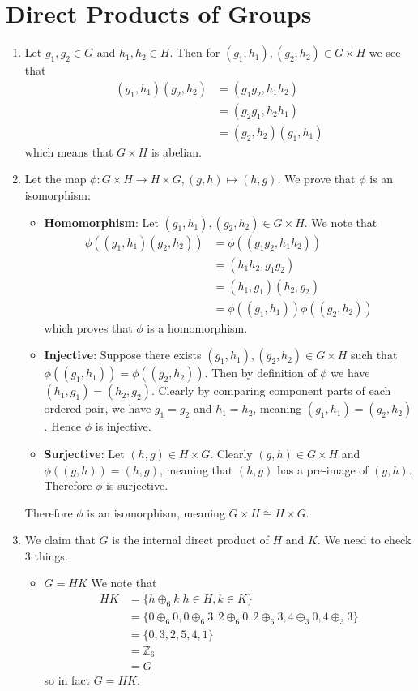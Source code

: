 \section{Direct Products of Groups}
\begin{enumerate}
    \item Let $g_1, g_2 \in G$ and $h_1, h_2 \in H$. Then for $(g_1, h_1), (g_2, h_2) \in G\times H$ we see that
    \begin{align*}
        (g_1, h_1)(g_2, h_2) &= (g_1g_2, h_1h_2)\\
        &= (g_2g_1, h_2h_1)\\
        &= (g_2,h_2)(g_1,h_1)
    \end{align*}
    which means that $G \times H$ is abelian.

    \item Let the map $\phi: G\times H \to H \times G, (g, h) \mapsto (h, g)$. We prove that $\phi$ is an isomorphism:
    \begin{itemize}
        \item \textbf{Homomorphism}: Let $(g_1, h_1), (g_2, h_2) \in G \times H$. We note that
        \begin{align*}
            \phi((g_1, h_1)(g_2, h_2)) &= \phi((g_1g_2, h_1h_2))\\
            &= (h_1h_2, g_1g_2)\\
            &= (h_1, g_1)(h_2, g_2)\\
            &= \phi((g_1, h_1))\phi((g_2, h_2))
        \end{align*}
        which proves that $\phi$ is a homomorphism.
        \item \textbf{Injective}: Suppose there exists $(g_1, h_1), (g_2, h_2) \in G \times H$ such that $\phi((g_1, h_1)) = \phi((g_2, h_2))$. Then by definition of $\phi$ we have $(h_1, g_1) = (h_2, g_2)$. Clearly by comparing component parts of each ordered pair, we have $g_1 = g_2$ and $h_1 = h_2$, meaning $(g_1, h_1) = (g_2, h_2)$. Hence $\phi$ is injective.
        \item \textbf{Surjective}: Let $(h, g) \in H \times G$. Clearly $(g, h) \in G \times H$ and $\phi((g, h)) = (h, g)$, meaning that $(h, g)$ has a pre-image of $(g, h)$. Therefore $\phi$ is surjective.
    \end{itemize}
    Therefore $\phi$ is an isomorphism, meaning $G \times H \cong H \times G$.

    \item We claim that $G$ is the internal direct product of $H$ and $K$. We need to check 3 things.
    \begin{itemize}
        \item $\boxed{G = HK}$ We note that
        \begin{align*}
            HK &= \{h \oplus_6 k \vert h \in H, k \in K\}\\
            &= \{0 \oplus_6 0, 0 \oplus_6 3, 2 \oplus_6 0, 2 \oplus_6 3, 4 \oplus_3 0, 4 \oplus_3 3\}\\
            &= \{0, 3, 2, 5, 4, 1\}\\
            &= \mathbb{Z}_6\\
            &= G
        \end{align*}
        so in fact $G = HK$.


\end{itemize}
\end{enumerate}
